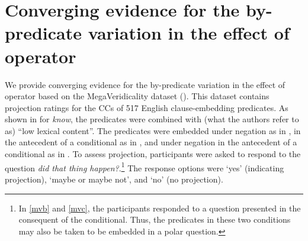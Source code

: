 \documentclass[a4paper,12pt,twoside]{article}
\newcommand{\posscite}[1]{\citeauthor{#1}'s (\citeyear{#1})}
\begin{document}
   
\section{Converging evidence for the by-predicate variation in the effect of operator}\label{s:converging}

    We provide converging evidence for the by-predicate variation in the effect of operator based on the Mega\-Ve\-ri\-dicality dataset (\citealt{white_role_2018}). This dataset contains projection ratings for the CCs of 517 English clause-embedding predicates. As shown in \Next for \emph{know}, the predicates were combined with (what the authors refer to as) ``low lexical content''. %
    The predicates were embedded under negation as in \Next[a], in the antecedent of a conditional as in \Next[b], and under negation in the antecedent of a conditional as in \Next[c]. To assess projection, participants were asked to respond to the question \emph{did that thing happen?}.\footnote{In \ref{mvb} and \ref{mvc}, the participants responded to a question presented in the consequent of the conditional. Thus, the predicates in these two conditions may also be taken to be embedded in a polar question.} %
    The response options were ‘yes’ (indicating projection), ‘maybe or maybe not’, and ‘no’ (no projection).

\end{document}
